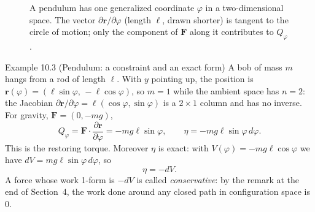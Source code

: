 \documentclass[11pt,letterpaper]{article}
\begin{document}
\begin{figure}[htbp]
\centering
{}
\caption{A pendulum has one generalized coordinate $\varphi$ in a two-dimensional space. The vector $\partial\mathbf r/\partial\varphi$ (length $\ell$, drawn shorter) is tangent to the circle of motion; only the component of $\mathbf F$ along it contributes to $Q_\varphi$.}
\label{fig:pendulum}
\end{figure}
\FloatBarrier

\begin{examplebox}{Example 10.3 (Pendulum: a constraint and an exact form)}
A bob of mass $m$ hangs from a rod of length $\ell$. With $y$ pointing up, the position is $\mathbf r(\varphi)=(\ell\sin\varphi,\,-\ell\cos\varphi)$, so $m=1$ while the ambient space has $n=2$: the Jacobian $\partial\mathbf r/\partial\varphi=\ell(\cos\varphi,\sin\varphi)$ is a $2\times1$ column and has no inverse. For gravity, $\mathbf F=(0,-mg)$,
\[
Q_\varphi=\mathbf F\cdot\frac{\partial\mathbf r}{\partial\varphi}=-mg\ell\sin\varphi,
\qquad
\eta=-mg\ell\sin\varphi\,d\varphi .
\]
This is the restoring torque. Moreover $\eta$ is exact: with $V(\varphi)=-mg\ell\cos\varphi$ we have $dV=mg\ell\sin\varphi\,d\varphi$, so
\[
\eta=-dV.
\]
A force whose work 1-form is $-dV$ is called \emph{conservative}: by the remark at the end of Section~4, the work done around any closed path in configuration space is $0$.
\end{examplebox}
\end{document}
